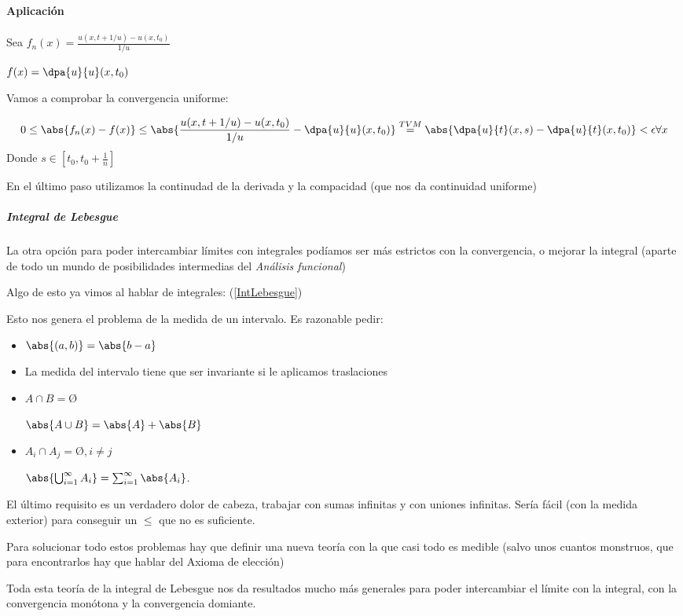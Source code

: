 \paragraph{Aplicación}

Sea $f_n(x) = \frac{u(x,t+1/u) - u(x,t_0)}{1/u}$

$f(x) = \dpa{u}{u}(x,t_0)$

Vamos a comprobar la convergencia uniforme:

\[0\leq \abs{f_n(x) - f(x)} \leq \abs{\frac{u(x,t+1/u) - u(x,t_0)}{1/u} - \dpa{u}{u}(x,t_0)} \stackrel{TVM}{=} \abs{\dpa{u}{t}(x,s) - \dpa{u}{t}(x,t_0)} < \epsilon \forall x\]
Donde $s\in [t_0,t_0+\frac{1}{n}]$

En el último paso utilizamos la continudad de la derivada y la compacidad (que nos da continuidad uniforme)


\subparagraph{Integral de Lebesgue}
La otra opción para poder intercambiar límites con integrales podíamos ser más estrictos con la convergencia, o mejorar la integral (aparte de todo un mundo de posibilidades intermedias del \textit{Análisis funcional})

Algo de esto ya vimos al hablar de integrales: (\ref{IntLebesgue})

Esto nos genera el problema de la medida de un intervalo.
Es razonable pedir:
\begin{itemize}
\item $\abs{(a,b)} = \abs{b-a}$
\item La medida del intervalo tiene que ser invariante si le aplicamos traslaciones
\item $A\cap B = Ø $

$\abs{A \cup B} = \abs{A} + \abs{B}$
\item $A_i \cap A_j = Ø, i\neq j$

$\abs{\bigcup_{i=1}^{\infty} A_i} = \sum_{i=1}^{\infty} \abs{A_i}$.


\end{itemize}
El último requisito es un verdadero dolor de cabeza, trabajar con sumas infinitas y con uniones infinitas. Sería fácil (con la medida exterior) para conseguir un $\leq$ que no es suficiente.

Para solucionar todo estos problemas hay que definir una nueva teoría con la que casi todo es medible (salvo unos cuantos monstruos, que para encontrarlos hay que hablar del Axioma de elección)

Toda esta teoría de la integral de Lebesgue nos da resultados mucho más generales para poder intercambiar el límite con la integral, con la convergencia monótona y la convergencia domiante.
